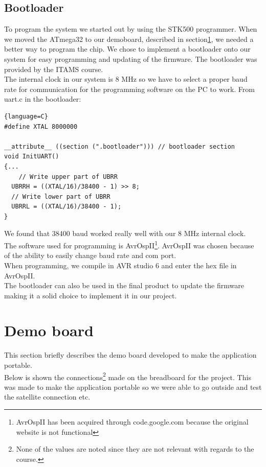 \subsection{Bootloader}
To program the system we started out by using the STK500 programmer. When we moved the ATmega32 to our demoboard, described in section\ref{sec:demob}, we needed a better way to program the chip. We chose to implement a bootloader onto our system for easy programming and updating of the firmware. The bootloader was provided by the ITAMS course.\\
The internal clock in our system is 8 MHz so we have to select a proper baud rate for communication for the programming software on the PC to work. From uart.c in the bootloader:
\begin{lstlisting}{language=C}
#define XTAL 8000000  

__attribute__ ((section (".bootloader"))) // bootloader section
void InitUART()
{...
	// Write upper part of UBRR
  UBRRH = ((XTAL/16)/38400 - 1) >> 8;
  // Write lower part of UBRR
  UBRRL = ((XTAL/16)/38400 - 1);
}
\end{lstlisting}
We found that 38400 baud worked really well with our 8 MHz internal clock.\\
The software used for programming is AvrOspII\footnote{AvrOspII has been acquired through code.google.com because the original website is not functional}. AvrOspII was chosen because of the ability to easily change baud rate and com port.\\
When programming, we compile in AVR studio 6 and enter the hex file in AvrOspII.\\
The bootloader can also be used in the final product to update the firmware making it a solid choice to implement it in our project.\\

\section{Demo board}
\label{sec:demob}
This section briefly describes the demo board developed to make the application portable.\\
Below is shown the connections\footnote{None of the values are noted since they are not relevant with regards to the course.} made on the breadboard for the project. This was made to make the application portable so we were able to go outside and test the satellite connection etc.\\

